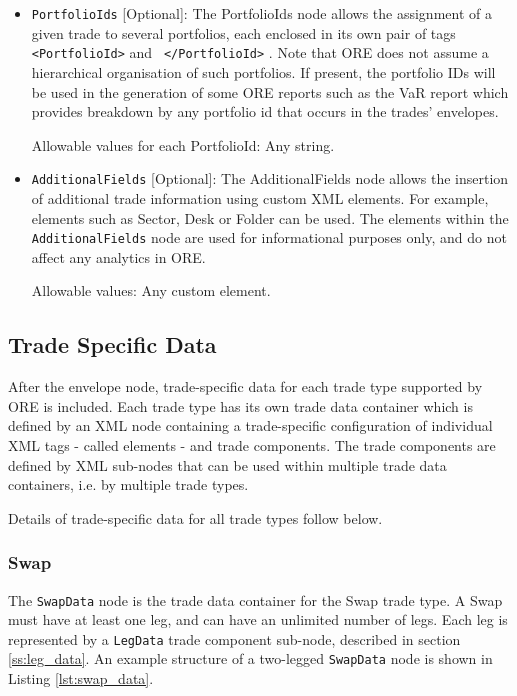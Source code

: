 \begin{itemize}
\item \lstinline!PortfolioIds! [Optional]: The PortfolioIds node
  allows the assignment of a given trade to several portfolios, each
  enclosed in its own pair of tags {\tt <PortfolioId>} and {\tt
    </PortfolioId>} . Note that ORE does not assume a hierarchical 
 organisation of such portfolios. If present, the portfolio IDs will be used in the
  generation of some ORE reports such as the VaR report which provides
  breakdown by any portfolio id that occurs in the trades' envelopes.

Allowable values for each PortfolioId: Any string.

\item \lstinline!AdditionalFields! [Optional]: The AdditionalFields node allows the insertion of additional trade
  information using custom XML elements.  For example, elements such as Sector, Desk or Folder can be used. The elements
  within the \lstinline!AdditionalFields! node are used for
  informational purposes only, and do not affect any analytics in ORE.

Allowable values: Any custom element.

\end{itemize}

\subsection{Trade Specific Data}

After the envelope node, trade-specific data for each trade type supported by
ORE is included. 
Each trade type has its own trade data container which is defined by an XML node containing a trade-specific
configuration of individual XML tags - called elements - and trade components. The trade components are defined by XML
sub-nodes that can be used within multiple trade data containers, i.e.  by multiple trade types.

\vspace{1em}

Details of  trade-specific data for all trade types follow below.

\subsubsection{Swap}

The \lstinline!SwapData! node is the trade data container for the Swap trade type. A Swap must have at least one leg,
and can have an unlimited number of legs. Each leg is represented by a \lstinline!LegData! trade component sub-node,
described in section \ref{ss:leg_data}. An example structure of a two-legged \lstinline!SwapData!
node is shown in Listing \ref{lst:swap_data}.

